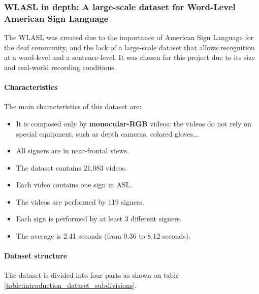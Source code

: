 \subsubsection{WLASL in depth: A large-scale dataset for Word-Level American Sign Language}
The WLASL was created due to the importance of American Sign Language for the deaf community, and the lack of a large-scale dataset that allows recognition at a word-level and a sentence-level.
It was chosen for this project due to its size and real-world recording conditions.

\paragraph{Characteristics}
The main characteristics of this dataset are:
\begin{itemize}[noitemsep]
    \item It is composed only by \textbf{monocular-RGB} videos: the videos do not rely on special equipment, such as depth cameras, colored gloves...
    \item All signers are in near-frontal views.
    \item The dataset contains 21.083 videos.
    \item Each video contains one sign in ASL.
    \item The videos are performed by 119 signers.
    \item Each sign is performed by at least 3 different signers.
    \item The average is 2.41 seconds (from 0.36 to 8.12 seconds).
\end{itemize}

\paragraph{Dataset structure}
The dataset is divided into four parts as shown on table \ref{table:introduction_dataset_subdivisions}.
\begin{table}[h]
    \centering
\caption{WLASL dataset structure}
\label{table:introduction_dataset_subdivisions}
\end{table}

